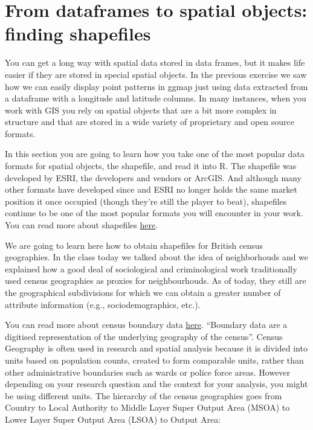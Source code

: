 \documentclass[]{book}
\begin{document}
\hypertarget{from-dataframes-to-spatial-objects-finding-shapefiles}{%
\section{From dataframes to spatial objects: finding shapefiles}\label{from-dataframes-to-spatial-objects-finding-shapefiles}}

You can get a long way with spatial data stored in data frames, but it makes life easier if they are stored in special spatial objects. In the previous exercise we saw how we can easily display point patterns in ggmap just using data extracted from a dataframe with a longitude and latitude columns. In many instances, when you work with GIS you rely on spatial objects that are a bit more complex in structure and that are stored in a wide variety of proprietary and open source formats.

In this section you are going to learn how you take one of the most popular data formats for spatial objects, the shapefile, and read it into R. The shapefile was developed by ESRI, the developers and vendors or ArcGIS. And although many other formats have developed since and ESRI no longer holds the same market position it once occupied (though they're still the player to beat), shapefiles continue to be one of the most popular formats you will encounter in your work. You can read more about shapefiles \href{https://en.wikipedia.org/wiki/Shapefile}{here}.

We are going to learn here how to obtain shapefiles for British census geographies. In the class today we talked about the idea of neighborhouds and we explained how a good deal of sociological and criminological work traditionally used census geographies as proxies for neighbourhouds. As of today, they still are the geographical subdivisions for which we can obtain a greater number of attribute information (e.g., sociodemographics, etc.).

You can read more about census boundary data \href{https://census.ukdataservice.ac.uk/use-data/guides/boundary-data}{here}. ``Boundary data are a digitised representation of the underlying geography of the census''. Census Geography is often used in research and spatial analysis because it is divided into units based on population counts, created to form comparable units, rather than other administrative boundaries such as wards or police force areas. However depending on your research question and the context for your analysis, you might be using different units. The hierarchy of the census geographies goes from Country to Local Authority to Middle Layer Super Output Area (MSOA) to Lower Layer Super Output Area (LSOA) to Output Area:
\end{document}
